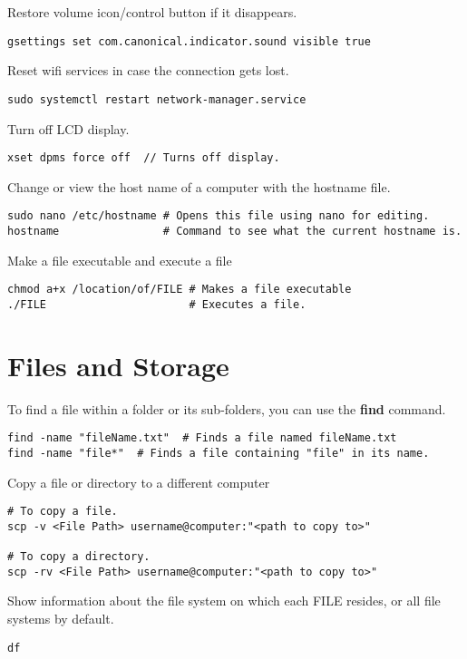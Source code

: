 Restore volume icon/control button if it disappears.
\begin{lstlisting}
gsettings set com.canonical.indicator.sound visible true
\end{lstlisting}

Reset wifi services in case the connection gets lost.
\begin{lstlisting}
sudo systemctl restart network-manager.service
\end{lstlisting}

Turn off LCD display.
\begin{lstlisting}
xset dpms force off  // Turns off display.
\end{lstlisting}

Change or view the host name of a computer with the hostname file.
\begin{lstlisting}
sudo nano /etc/hostname # Opens this file using nano for editing.
hostname                # Command to see what the current hostname is.
\end{lstlisting}

Make a file executable and execute a file
\begin{lstlisting}
chmod a+x /location/of/FILE # Makes a file executable
./FILE                      # Executes a file.
\end{lstlisting}



\section{Files and Storage}

To find a file within a folder or its sub-folders, you can use the \textbf{find} command.
\begin{lstlisting}
find -name "fileName.txt"  # Finds a file named fileName.txt
find -name "file*"  # Finds a file containing "file" in its name.
\end{lstlisting}

Copy a file or directory to a different computer
\begin{lstlisting}
# To copy a file.
scp -v <File Path> username@computer:"<path to copy to>"

# To copy a directory.
scp -rv <File Path> username@computer:"<path to copy to>"
\end{lstlisting}

Show information about the file system on which each FILE resides, or all file systems by default.
\begin{lstlisting}
df 
\end{lstlisting}

